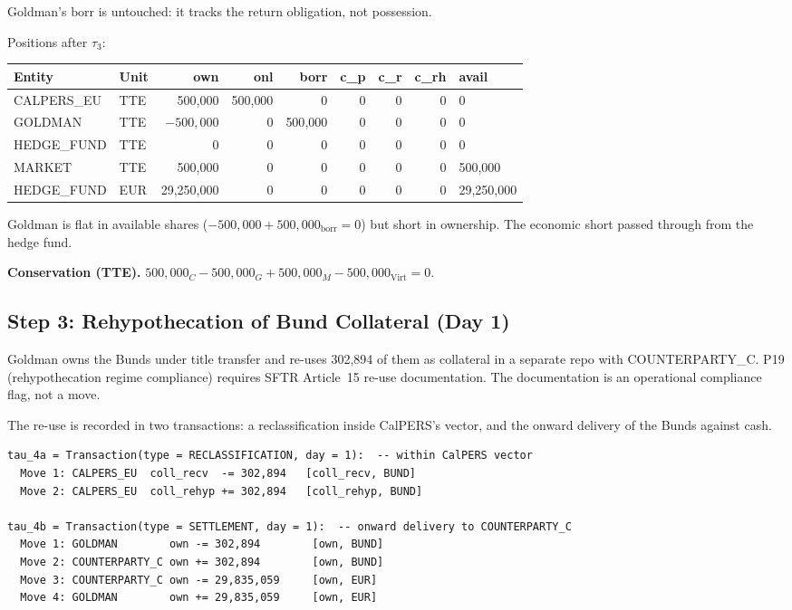 \noindent Goldman's $\mathrm{borr}$ is untouched: it tracks the return obligation, not possession.

Positions after $\tau_3$:

\begin{center}\small
\begin{tabular}{l l r r r r r r l}
\toprule
\textbf{Entity} & \textbf{Unit} & own & onl & borr & c\_p & c\_r & c\_rh & avail \\
\midrule
CALPERS\_EU & TTE & 500{,}000 & 500{,}000 & 0 & 0 & 0 & 0 & 0 \\
GOLDMAN & TTE & $-500{,}000$ & 0 & 500{,}000 & 0 & 0 & 0 & 0 \\
HEDGE\_FUND & TTE & 0 & 0 & 0 & 0 & 0 & 0 & 0 \\
MARKET & TTE & 500{,}000 & 0 & 0 & 0 & 0 & 0 & 500{,}000 \\
HEDGE\_FUND & EUR & 29{,}250{,}000 & 0 & 0 & 0 & 0 & 0 & 29{,}250{,}000 \\
\bottomrule
\end{tabular}
\end{center}

\noindent Goldman is flat in available shares ($-500{,}000 + 500{,}000_{\mathrm{borr}} = 0$) but short in ownership. The economic short passed through from the hedge fund.

\noindent\textbf{Conservation (TTE).} $500{,}000_C - 500{,}000_G + 500{,}000_M - 500{,}000_{\mathrm{Virt}} = 0$. \checkmark

\subsection{Step 3: Rehypothecation of Bund Collateral (Day 1)}
\label{sec:eu-step3}

Goldman owns the Bunds under title transfer and re-uses 302{,}894 of them as collateral in a separate repo with COUNTERPARTY\_C. P19 (rehypothecation regime compliance) requires SFTR Article~15 re-use documentation. The documentation is an operational compliance flag, not a move.

The re-use is recorded in two transactions: a reclassification inside CalPERS's vector, and the onward delivery of the Bunds against cash.

\begin{lstlisting}
tau_4a = Transaction(type = RECLASSIFICATION, day = 1):  -- within CalPERS vector
  Move 1: CALPERS_EU  coll_recv  -= 302,894   [coll_recv, BUND]
  Move 2: CALPERS_EU  coll_rehyp += 302,894   [coll_rehyp, BUND]

tau_4b = Transaction(type = SETTLEMENT, day = 1):  -- onward delivery to COUNTERPARTY_C
  Move 1: GOLDMAN        own -= 302,894        [own, BUND]
  Move 2: COUNTERPARTY_C own += 302,894        [own, BUND]
  Move 3: COUNTERPARTY_C own -= 29,835,059     [own, EUR]
  Move 4: GOLDMAN        own += 29,835,059     [own, EUR]
\end{lstlisting}

